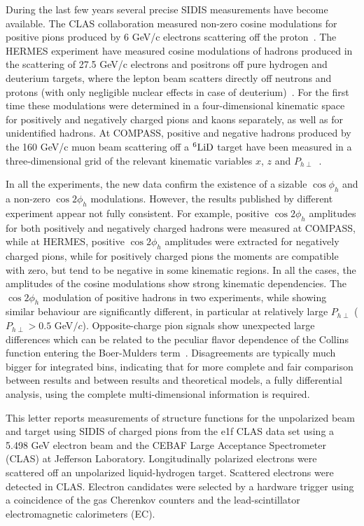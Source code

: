 \documentclass[aps,prl,twocolumn,showpacs,superscriptaddress,groupedaddress]{revtex4}  %
\newcommand{\Phperp}{P_{h\perp}}
\begin{document}
During the last few years several precise SIDIS measurements have become available. The CLAS
collaboration measured non-zero cosine modulations for positive pions produced
by 6 GeV/c electrons scattering off the proton~\cite{Osipenko:2008rv}.  The
HERMES experiment have measured cosine modulations of hadrons produced in the
scattering of 27.5 GeV/c electrons and positrons off pure hydrogen and deuterium
targets, where the lepton beam scatters directly off neutrons and protons (with
only negligible nuclear effects in case of
deuterium)~\cite{Airapetian:2012yg}. For the first time these modulations were
determined in a four-dimensional kinematic space for positively and negatively
charged pions and kaons separately, as well as for unidentified hadrons. At
COMPASS, positive and negative hadrons produced by the 160 GeV/c muon beam
scattering off a $\rm ^6LiD$ target have been measured in a three-dimensional
grid of the relevant kinematic variables $x$, $z$ and
$\Phperp$~\cite{Adolph:2014pwc}.

In all the experiments, the new data confirm the existence of a sizable
$\cos\phi_h$ and a non-zero $\cos2\phi_h$ modulations.  However, the results
published by different experiment appear not fully consistent. For example,
positive $\cos2\phi_h$ amplitudes for both positively and negatively charged
hadrons were measured at COMPASS, while at HERMES, positive $\cos 2\phi_h$ amplitudes
were extracted for negatively charged pions, while for positively charged pions
the moments are compatible with zero, but tend to be negative in some kinematic
regions. In all the cases, the amplitudes of the cosine modulations show strong
kinematic dependencies. 
The $\cos2\phi_h$ modulation of positive hadrons in two experiments, while showing similar behaviour are significantly different, in particular at relatively large $\Phperp$  ($\Phperp>0.5$ GeV$/c$).
Opposite-charge pion signals show unexpected large differences which can be related to the peculiar flavor dependence of the Collins function entering the Boer-Mulders term~\cite{Airapetian:2012yg}. Disagreements are typically much bigger for integrated bins, indicating that for 
more complete and fair comparison between results and between results
and theoretical models, a fully differential analysis, using the complete
multi-dimensional information is required.


This letter reports measurements of structure functions for the unpolarized beam and target using SIDIS of charged pions from the e1f CLAS data set 
using a 5.498 GeV electron beam and the CEBAF Large Acceptance 
Spectro\-meter (CLAS) \cite{Mecking:2003zu} at Jefferson Laboratory.
Longitudinally polarized electrons were scattered off
an unpolarized liquid-hydrogen target. 
Scattered electrons were detected in CLAS.
Electron candidates were selected by a hardware trigger using a 
coincidence of the gas Cherenkov counters and the lead-scintillator electromagnetic calorimeters (EC). 
\end{document}
